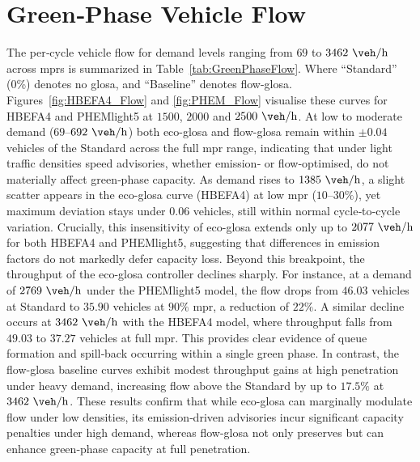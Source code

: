 \section{Green‐Phase Vehicle Flow}
\label{sec:Results_GreenPhaseFlow}

The per‐cycle vehicle flow for demand levels ranging from $69$ to $3462~\unit{\veh\per\hour}$ across \acp{mpr} is summarized in Table~\vref{tab:GreenPhaseFlow}. Where \enquote{Standard} (0\%) denotes no \ac{glosa}, and \enquote{Baseline} denotes \ac{flow-glosa}. Figures~\vref{fig:HBEFA4_Flow} and \vref{fig:PHEM_Flow} visualise these curves for HBEFA4 and PHEMlight5 at $1500$, $2000$ and $2500~\unit{\veh\per\hour}$. At low to moderate demand ($69$–$692~\unit{\veh\per\hour}$) both \ac{eco-glosa} and \ac{flow-glosa} remain within $\pm0.04$ vehicles of the Standard across the full \ac{mpr} range, indicating that under light traffic densities speed advisories, whether emission‐ or flow‐optimised, do not materially affect green‐phase capacity. As demand rises to $1385~\unit{\veh\per\hour}$, a slight scatter appears in the \ac{eco-glosa} curve (HBEFA4) at low \ac{mpr} ($10$–$30\%$), yet maximum deviation stays under $0.06$ vehicles, still within normal cycle‐to‐cycle variation. 
Crucially, this insensitivity of \ac{eco-glosa} extends only up to $2077~\unit{\veh\per\hour}$ for both HBEFA4 and PHEMlight5, suggesting that differences in emission factors do not markedly defer capacity loss. Beyond this breakpoint, the throughput of the \ac{eco-glosa} controller declines sharply. For instance, at a demand of $2769~\unit{\veh\per\hour}$ under the PHEMlight5 model, the flow drops from $46.03$ vehicles at Standard to $35.90$ vehicles at $90\%$ \ac{mpr}, a reduction of $22\%$. A similar decline occurs at $3462~\unit{\veh\per\hour}$ with the HBEFA4 model, where throughput falls from $49.03$ to $37.27$ vehicles at full \ac{mpr}. This provides clear evidence of queue formation and spill‐back occurring within a single green phase. In contrast, the \ac{flow-glosa} baseline curves exhibit modest throughput gains at high penetration under heavy demand, increasing flow above the Standard by up to $17.5\%$ at $3462~\unit{\veh\per\hour}$. These results confirm that while \ac{eco-glosa} can marginally modulate flow under low densities, its emission‐driven advisories incur significant capacity penalties under high demand, whereas \ac{flow-glosa} not only preserves but can enhance green‐phase capacity at full penetration.

